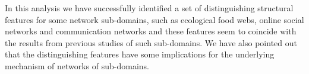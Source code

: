  In this analysis we have successfully identified a set of distinguishing structural features for some network sub-domains, such as ecological food webs, online social networks and communication networks and these features seem to coincide with the results from previous studies of such sub-domains. We have also pointed out that the distinguishing features have some implications for the underlying mechanism of networks of sub-domains.

\begin{figure}
\centering 

\qquad
{}\qquad


\end{figure}
